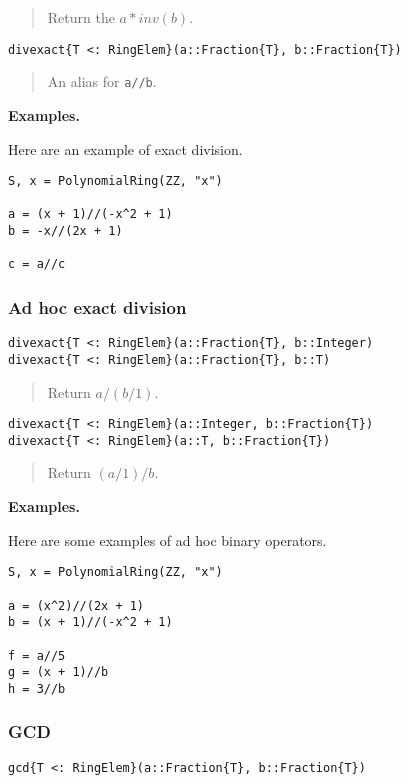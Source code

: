 \documentclass[a4paper,10pt]{article}
\newcommand{\code}{\lstinline}
\newcommand{\desc}[1]{\vspace{-3mm}\begin{quote}#1\end{quote}}
\begin{document}
\desc{Return the $a*inv(b)$.}

\begin{lstlisting}
divexact{T <: RingElem}(a::Fraction{T}, b::Fraction{T})
\end{lstlisting}

\desc{An alias for \code{a//b}.}

\textbf{Examples.}

Here are an example of exact division.

\begin{lstlisting}
S, x = PolynomialRing(ZZ, "x")

a = (x + 1)//(-x^2 + 1) 
b = -x//(2x + 1)

c = a//c
\end{lstlisting}

\subsubsection{Ad hoc exact division}

\begin{lstlisting}
divexact{T <: RingElem}(a::Fraction{T}, b::Integer)
divexact{T <: RingElem}(a::Fraction{T}, b::T)
\end{lstlisting}

\desc{Return $a / (b/1)$.}

\begin{lstlisting}
divexact{T <: RingElem}(a::Integer, b::Fraction{T})
divexact{T <: RingElem}(a::T, b::Fraction{T})
\end{lstlisting}

\desc{Return $(a/1) / b$.}

\textbf{Examples.}

Here are some examples of ad hoc binary operators.

\begin{lstlisting}
S, x = PolynomialRing(ZZ, "x")

a = (x^2)//(2x + 1)
b = (x + 1)//(-x^2 + 1)

f = a//5
g = (x + 1)//b
h = 3//b
\end{lstlisting}

\subsubsection{GCD}

\begin{lstlisting}
gcd{T <: RingElem}(a::Fraction{T}, b::Fraction{T})
\end{lstlisting}
\end{document}
